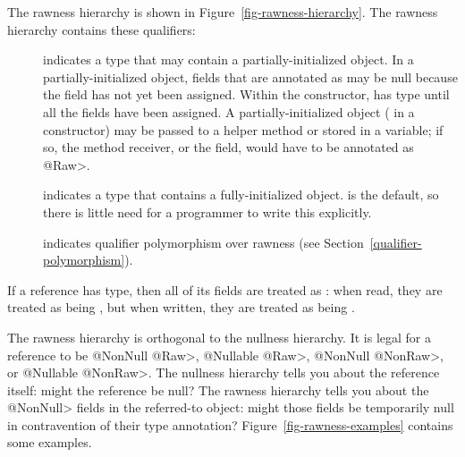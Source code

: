 The rawness hierarchy is shown in Figure~\ref{fig-rawness-hierarchy}.
The rawness hierarchy contains these qualifiers:

\begin{description}

\item[]
  indicates a type that may contain a partially-initialized object.  In a
  partially-initialized object, fields that are annotated as
   may be null because the field
  has not yet been assigned.  Within the constructor,
   has  type until all
  the  fields have been assigned.
  A partially-initialized object ( in a constructor) may be
  passed to a helper method or stored in a variable; if so, the method
  receiver, or the field, would have to be annotated as \<@Raw>.

\item[]
  indicates a type that contains a fully-initialized object.  
  is the default, so there is little need for a programmer to write this
  explicitly.

\item[]
  indicates qualifier polymorphism over rawness (see
  Section~\ref{qualifier-polymorphism}).

\end{description}


If a reference has
 type, then all of its  fields are treated as
:  when read, they are
treated as being , but when
written, they are treated as being
.


The rawness hierarchy is orthogonal to the nullness hierarchy.  It
is legal for a reference to be \<@NonNull @Raw>, \<@Nullable @Raw>,
\<@NonNull @NonRaw>, or \<@Nullable @NonRaw>.  The nullness hierarchy tells
you about the reference itself:  might the reference be null?  The rawness
hierarchy tells you about the \<@NonNull> fields in the referred-to object:
might those fields be temporarily null in contravention of their
type annotation?
Figure~\ref{fig-rawness-examples} contains some examples.

